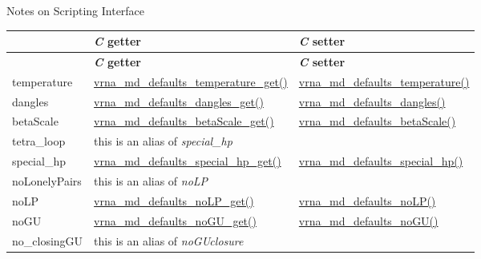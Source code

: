 \begin{DoxyRefDesc}{Notes on Scripting Interface}
\tabulinesep=1mm
\begin{longtabu} spread 0pt [c]{*3{|X[-1]}|}
\hline
{}&{\bf {\itshape C} getter }&{\bf {\itshape C} setter  }\\
\endfirsthead
\hline
\endfoot
\hline
{}&{\bf {\itshape C} getter }&{\bf {\itshape C} setter  }\\
\endhead
temperature &\hyperlink{group__model__details_ga96b24a74437f9ba46c4e06343155bf46}{vrna\+\_\+md\+\_\+defaults\+\_\+temperature\+\_\+get()} &\hyperlink{group__model__details_gaf9e527e9a2f7e6fd6e42bc6e602f5445}{vrna\+\_\+md\+\_\+defaults\+\_\+temperature()} \\
dangles &\hyperlink{group__model__details_ga67ca06f95ae133778c79a4493c9817b8}{vrna\+\_\+md\+\_\+defaults\+\_\+dangles\+\_\+get()} &\hyperlink{group__model__details_gac76a5374def8e5e4e644ff6e4cc72dee}{vrna\+\_\+md\+\_\+defaults\+\_\+dangles()} \\
beta\+Scale &\hyperlink{group__model__details_gabb8780f5410c52f970d75b044059bd09}{vrna\+\_\+md\+\_\+defaults\+\_\+beta\+Scale\+\_\+get()} &\hyperlink{group__model__details_gae984567db36c3f9b8731ecc917abf3a2}{vrna\+\_\+md\+\_\+defaults\+\_\+beta\+Scale()} \\
tetra\+\_\+loop &this is an alias of {\itshape special\+\_\+hp} &\\
special\+\_\+hp &\hyperlink{group__model__details_ga1d68a6efdaa1253cc63fd9cd06452559}{vrna\+\_\+md\+\_\+defaults\+\_\+special\+\_\+hp\+\_\+get()} &\hyperlink{group__model__details_gafff6449a02744add0308e653230c15fc}{vrna\+\_\+md\+\_\+defaults\+\_\+special\+\_\+hp()} \\
no\+Lonely\+Pairs &this is an alias of {\itshape no\+LP} &\\
no\+LP &\hyperlink{group__model__details_ga934344888fbacaed538bbbfe910f2aa6}{vrna\+\_\+md\+\_\+defaults\+\_\+no\+L\+P\+\_\+get()} &\hyperlink{group__model__details_ga2f88ffc393ac9d7987849c965fd29ea8}{vrna\+\_\+md\+\_\+defaults\+\_\+no\+L\+P()} \\
no\+GU &\hyperlink{group__model__details_ga5faa7d4e536d7fe36ec25428c0cf2563}{vrna\+\_\+md\+\_\+defaults\+\_\+no\+G\+U\+\_\+get()} &\hyperlink{group__model__details_ga98218f85c7a957a1d1ddf4627fdf5a39}{vrna\+\_\+md\+\_\+defaults\+\_\+no\+G\+U()} \\
no\+\_\+closing\+GU &this is an alias of {\itshape no\+G\+Uclosure} &\\

\end{longtabu}
\end{DoxyRefDesc}
